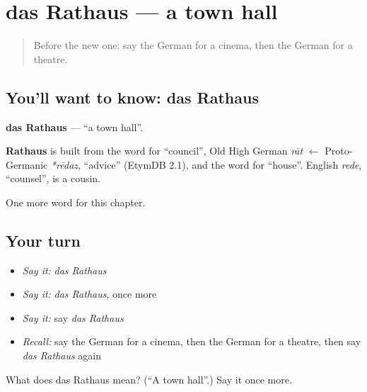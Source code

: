 \section[das Rathaus]{das Rathaus — a town hall}

\label{lesson:GE-C105-rathaus}



\begin{quote}
Before the new one: say the German for a cinema, then the German for a theatre.
\end{quote}

\subsection*{You'll want to know: das Rathaus}
\textbf{das Rathaus} — \textquotedblleft{}a town hall\textquotedblright{}.

\begin{cousinweb}
\textbf{Rathaus} is built from the word for \textquotedblleft{}council\textquotedblright{}, Old High German \emph{rāt} $\leftarrow$ Proto-Germanic \emph{*rēdaz}, \textquotedblleft{}advice\textquotedblright{} (EtymDB 2.1), and the word for \textquotedblleft{}house\textquotedblright{}. English \emph{rede}, \textquotedblleft{}counsel\textquotedblright{}, is a cousin.
\end{cousinweb}

\begin{grammarlens}[title={What you've built}]
One more word for this chapter.
\end{grammarlens}

\subsection*{Your turn}
\begin{itemize}
\raggedright
  \item \emph{Say it:} \emph{das Rathaus}
  \item \emph{Say it:} \emph{das Rathaus}, once more
  \item \emph{Say it:} say \emph{das Rathaus}
  \item \emph{Recall:} say the German for a cinema, then the German for a theatre, then say \emph{das Rathaus} again
\end{itemize}

\begin{tcolorbox}[breakable,colback=teal!4,colframe=teal!35!black,title={Before you move on}]
What does das Rathaus mean? (\textquotedblleft{}A town hall\textquotedblright{}.) Say it once more.
\end{tcolorbox}
